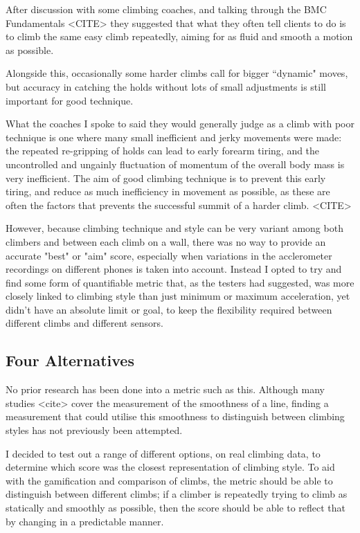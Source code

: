After discussion with some climbing coaches, and talking through the BMC Fundamentals <CITE> they suggested that what they often tell clients to do is to climb the same easy climb repeatedly, aiming for as fluid and smooth a motion as possible.




Alongside this, occasionally some harder climbs call for bigger ``dynamic" moves, but accuracy in catching the holds without lots of small adjustments is still important for good technique.


What the coaches I spoke to said they would generally judge as a climb with poor technique is one where many small inefficient and jerky movements were made: the repeated re-gripping of holds can lead to early forearm tiring, and the uncontrolled and ungainly fluctuation of momentum of the overall body mass is very inefficient.
The aim of good climbing technique is to prevent this early tiring, and reduce as much inefficiency in movement as possible, as these are often the factors that prevents the successful summit of a harder climb. <CITE>

However, because climbing technique and style can be very variant among both climbers and between each climb on a wall, there was no way to provide an accurate "best" or "aim" score, especially when variations in the acclerometer recordings on different phones is taken into account.
Instead I opted to try and find some form of quantifiable metric that, as the testers had suggested, was more closely linked to climbing style than just minimum or maximum acceleration, yet didn't have an absolute limit or goal, to keep the flexibility required between different climbs and different sensors.

\subsection{Four Alternatives}
No prior research has been done into a metric such as this.
Although many studies <cite> cover the measurement of the smoothness of a line, finding a measurement that could utilise this smoothness to distinguish between climbing styles has not previously been attempted.

I decided to test out a range of different options, on real climbing data, to determine which score was the closest representation of climbing style.
To aid with the gamification and comparison of climbs, the metric should be able to distinguish between different climbs; if a climber is repeatedly trying to climb as statically and smoothly as possible, then the score should be able to reflect that by changing in a predictable manner.


